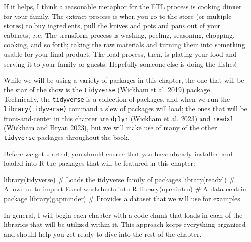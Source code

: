 \documentclass[
  letterpaper,
]{book}
\newenvironment{Shaded}{\begin{snugshade}}{\end{snugshade}}
\newcommand{\CommentTok}[1]{\textcolor[rgb]{0.37,0.37,0.37}{#1}}
\newcommand{\FunctionTok}[1]{\textcolor[rgb]{0.28,0.35,0.67}{#1}}
\newcommand{\NormalTok}[1]{\textcolor[rgb]{0.00,0.23,0.31}{#1}}
\begin{document}
If it helps, I think a reasonable metaphor for the ETL process is
cooking dinner for your family. The extract process is when you go to
the store (or multiple stores) to buy ingredients, pull the knives and
pots and pans out of your cabinets, etc. The transform process is
washing, peeling, seasoning, chopping, cooking, and so forth; taking the
raw materials and turning them into something usable for your final
product. The load process, then, is plating your food and serving it to
your family or guests. Hopefully someone else is doing the dishes!

While we will be using a variety of packages in this chapter, the one
that will be the star of the show is the \texttt{tidyverse} (Wickham et
al. 2019) package. Technically, the \texttt{tidyverse} is a collection
of packages, and when we run the \texttt{library(tidyverse)} command a
slew of packages will load; the ones that will be front-and-center in
this chapter are \texttt{dplyr} (Wickham et al. 2023) and
\texttt{readxl} (Wickham and Bryan 2023), but we will make use of many
of the other \texttt{tidyverse} packages throughout the book.

Before we get started, you should ensure that you have already installed
and loaded into R the packages that will be featured in this chapter:

\begin{Shaded}
\begin{Highlighting}[]
\FunctionTok{library}\NormalTok{(tidyverse) }\CommentTok{\# Loads the tidyverse family of packages}
\FunctionTok{library}\NormalTok{(readxl) }\CommentTok{\# Allows us to import Excel worksheets into R}
\FunctionTok{library}\NormalTok{(openintro) }\CommentTok{\# A data{-}centric package}
\FunctionTok{library}\NormalTok{(gapminder) }\CommentTok{\# Provides a dataset that we will use for examples}
\end{Highlighting}
\end{Shaded}

In general, I will begin each chapter with a code chunk that loads in
each of the libraries that will be utilized within it. This approach
keeps everything organized and should help you get ready to dive into
the rest of the chapter.
\end{document}

